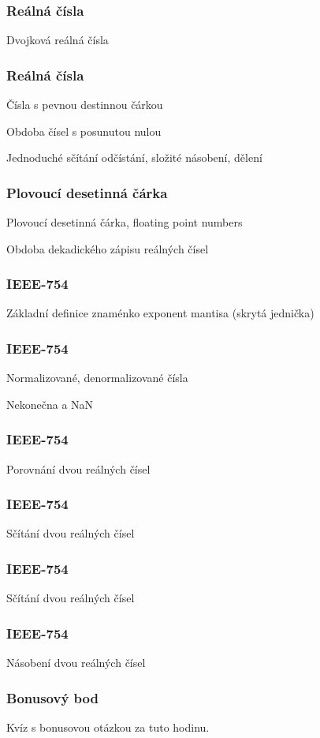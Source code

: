 \documentclass{beamer}
\begin{document}
\begin{frame}
\frametitle{Reálná čísla}

Dvojková reálná čísla

\end{frame}


\begin{frame}
\frametitle{Reálná čísla}

Čísla s pevnou destinnou čárkou

Obdoba čísel s posunutou nulou

Jednoduché sčítání odčístání, složité násobení, dělení
\end{frame}

\begin{frame}
\frametitle{Plovoucí desetinná čárka}

Plovoucí desetinná čárka, floating point numbers

Obdoba dekadického zápisu reálných čísel

\end{frame}

\begin{frame}
\frametitle{IEEE-754}

Základní definice znaménko exponent mantisa (skrytá jednička) 
\end{frame}


\begin{frame}
\frametitle{IEEE-754}

Normalizované, denormalizované čísla

Nekonečna a NaN
\end{frame}

\begin{frame}
\frametitle{IEEE-754}

Porovnání dvou reálných čísel

\end{frame}


\begin{frame}
\frametitle{IEEE-754}

Sčítání dvou reálných čísel

\end{frame}


\begin{frame}
\frametitle{IEEE-754}

Sčítání dvou reálných čísel

\end{frame}

\begin{frame}
\frametitle{IEEE-754}

Násobení dvou reálných čísel

\end{frame}

\begin{frame}
\frametitle{Bonusový bod}

Kvíz s bonusovou otázkou za tuto hodinu.

\end{frame}
\end{document}
